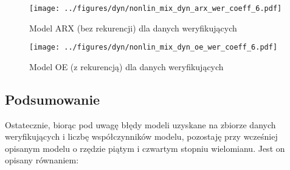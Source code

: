 \documentclass[a4paper,titlepage,11pt,floatssmall]{mwrep}
\begin{document}
\begin{figure}[H]
\centering
\texttt{[image: ../figures/dyn/nonlin\_mix\_dyn\_arx\_wer\_coeff\_6.pdf]}
\caption{Model ARX (bez rekurencji) dla danych weryfikujących}
\end{figure}

\begin{figure}[H]
\centering
\texttt{[image: ../figures/dyn/nonlin\_mix\_dyn\_oe\_wer\_coeff\_6.pdf]}
\caption{Model OE (z rekurencją) dla danych weryfikujących}
\end{figure}

\subsection{Podsumowanie}
Ostatecznie, biorąc pod uwagę błędy modeli uzyskane na zbiorze danych weryfikujących i liczbę współczynników modelu, pozostaję przy wcześniej opisanym modelu o rzędzie piątym i czwartym stopniu wielomianu. Jest on opisany równaniem:
\end{document}
